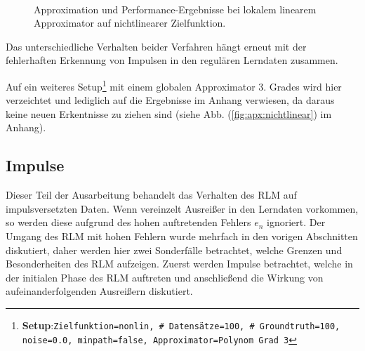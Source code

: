 \documentclass[a4paper, 12pt]{article}
\begin{document}
{\begin{figure}[H]
\begin{subfigure}[b]{0.4\textwidth}
                \caption{}
                \label{fig:perf:nichtlinear:perf}
        \end{subfigure}
        \\
        \caption{Approximation und Performance-Ergebnisse bei lokalem linearem Approximator auf nichtlinearer Zielfunktion.}
        \label{fig:perf:nichtlinear}
\end{figure}
Das unterschiedliche Verhalten beider Verfahren hängt erneut mit der fehlerhaften Erkennung von Impulsen in den regulären Lerndaten zusammen.

Auf ein weiteres Setup\footnote{\textbf{Setup}:\quad\texttt{Zielfunktion=nonlin, \# Datensätze=100, \# Groundtruth=100, noise=0.0, minpath=false, Approximator=Polynom Grad 3}} mit einem globalen Approximator 3. Grades wird hier verzeichtet und lediglich auf die Ergebnisse im Anhang verwiesen, da daraus keine neuen Erkentnisse zu ziehen sind (siehe Abb. (\ref{fig:apx:nichtlinear}) im Anhang).

\subsection{Impulse}
\label{sec:perf:impulse}
Dieser Teil der Ausarbeitung behandelt das Verhalten des RLM auf impulsversetzten Daten.
Wenn vereinzelt Ausreißer in den Lerndaten vorkommen, so werden diese aufgrund des hohen auftretenden Fehlers $e_n$ ignoriert. Der Umgang des RLM mit hohen Fehlern wurde mehrfach in den vorigen Abschnitten diskutiert, daher werden hier zwei Sonderfälle betrachtet, welche Grenzen und Besonderheiten des RLM aufzeigen.
Zuerst werden Impulse betrachtet, welche in der initialen Phase des RLM auftreten und anschließend die Wirkung von aufeinanderfolgenden Ausreißern diskutiert.

}
\end{document}
